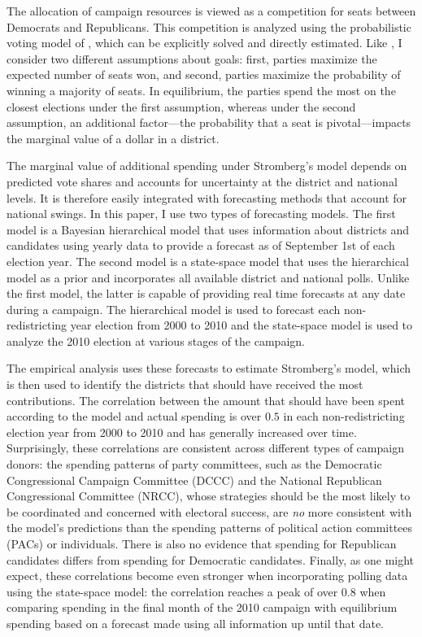 \documentclass[12pt,final,fleqn]{article}
\theoremstyle{plain}
\begin{document}
The allocation of campaign resources is viewed as a competition for seats between Democrats and Republicans. This competition is analyzed using the probabilistic voting model of \citet{stromberg2008electoral}, which can be explicitly solved and directly estimated. Like \citet{snyder1989election}, I consider two different assumptions about goals: first, parties maximize the expected number of seats won, and second, parties maximize the probability of winning a majority of seats. In equilibrium, the parties spend the most on the closest elections under the first assumption, whereas under the second assumption, an additional factor---the probability that a seat is pivotal---impacts the marginal value of a dollar in a district.

The marginal value of additional spending under Stromberg's model depends on predicted vote shares and accounts for uncertainty at the district and national levels. It is therefore easily integrated with forecasting methods that account for national swings. In this paper, I use two types of forecasting models. The first model is a Bayesian hierarchical model that uses information about districts and candidates using yearly data to provide a forecast as of September 1st of each election year. The second model is a state-space model that uses the hierarchical model as a prior and incorporates all available district and national polls. Unlike the first model, the latter is capable of providing real time forecasts at any date during a campaign. The hierarchical model is used to forecast each non-redistricting year election from 2000 to 2010 and the state-space model is used to analyze the 2010 election at various stages of the campaign.

The empirical analysis uses these forecasts to estimate Stromberg's model, which is then used to identify the districts that should have received the most contributions. The correlation between the amount that should have been spent according to the model and actual spending is over $0.5$ in each non-redistricting election year from 2000 to 2010 and has generally increased over time. Surprisingly, these correlations are consistent across different types of campaign donors: the spending patterns of party committees, such as the Democratic Congressional Campaign Committee (DCCC) and the National Republican Congressional Committee (NRCC), whose strategies should be the most likely to be coordinated and concerned with electoral success, are \emph{no} more consistent with the model's predictions than the spending patterns of political action committees (PACs) or individuals. There is also no evidence that spending for Republican candidates differs from spending for Democratic candidates. Finally, as one might expect, these correlations become even stronger when incorporating polling data using the state-space model: the correlation reaches a peak of over 0.8 when comparing spending in the final month of the 2010 campaign with equilibrium spending based on a forecast made using all information up until that date.
\end{document}
